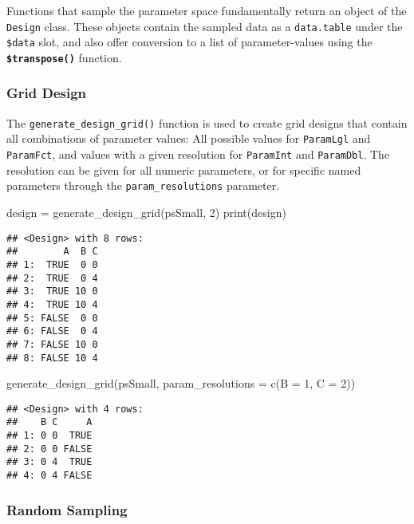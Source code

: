 \documentclass[
]{scrbook}
\newenvironment{Shaded}{\begin{snugshade}}{\end{snugshade}}
\newcommand{\AttributeTok}[1]{\textcolor[rgb]{0.77,0.63,0.00}{#1}}
\newcommand{\DecValTok}[1]{\textcolor[rgb]{0.00,0.00,0.81}{#1}}
\newcommand{\FunctionTok}[1]{\textcolor[rgb]{0.00,0.00,0.00}{#1}}
\newcommand{\NormalTok}[1]{#1}
\newcommand{\OtherTok}[1]{\textcolor[rgb]{0.56,0.35,0.01}{#1}}
\renewenvironment{Shaded} {\begin{snugshade}\small} {\end{snugshade}}
\begin{document}
Functions that sample the parameter space fundamentally return an object of the \texttt{Design} class.
These objects contain the sampled data as a \texttt{data.table} under the \texttt{\$data} slot, and also offer conversion to a list of parameter-values using the \textbf{\texttt{\$transpose()}} function.

\hypertarget{grid-design}{%
\subsubsection{Grid Design}\label{grid-design}}

The \texttt{generate\_design\_grid()} function is used to create grid designs that contain all combinations of parameter values: All possible values for \texttt{ParamLgl} and \texttt{ParamFct}, and values with a given resolution for \texttt{ParamInt} and \texttt{ParamDbl}.
The resolution can be given for all numeric parameters, or for specific named parameters through the \texttt{param\_resolutions} parameter.

\begin{Shaded}
\begin{Highlighting}[]
\NormalTok{design }\OtherTok{=} \FunctionTok{generate\_design\_grid}\NormalTok{(psSmall, }\DecValTok{2}\NormalTok{)}
\FunctionTok{print}\NormalTok{(design)}
\end{Highlighting}
\end{Shaded}

\begin{verbatim}
## <Design> with 8 rows:
##        A  B C
## 1:  TRUE  0 0
## 2:  TRUE  0 4
## 3:  TRUE 10 0
## 4:  TRUE 10 4
## 5: FALSE  0 0
## 6: FALSE  0 4
## 7: FALSE 10 0
## 8: FALSE 10 4
\end{verbatim}

\begin{Shaded}
\begin{Highlighting}[]
\FunctionTok{generate\_design\_grid}\NormalTok{(psSmall, }\AttributeTok{param\_resolutions =} \FunctionTok{c}\NormalTok{(}\AttributeTok{B =} \DecValTok{1}\NormalTok{, }\AttributeTok{C =} \DecValTok{2}\NormalTok{))}
\end{Highlighting}
\end{Shaded}

\begin{verbatim}
## <Design> with 4 rows:
##    B C     A
## 1: 0 0  TRUE
## 2: 0 0 FALSE
## 3: 0 4  TRUE
## 4: 0 4 FALSE
\end{verbatim}

\hypertarget{random-sampling}{%
\subsubsection{Random Sampling}\label{random-sampling}}
\end{document}
